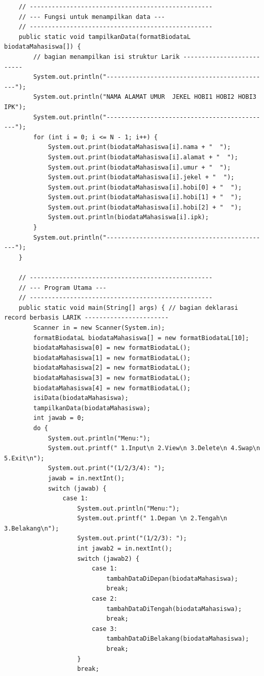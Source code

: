 \documentclass[a4paper,12pt]{article}
\begin{document}
\begin{lstlisting}
    // --------------------------------------------------
    // --- Fungsi untuk menampilkan data ---
    // --------------------------------------------------
    public static void tampilkanData(formatBiodataL biodataMahasiswa[]) {
        // bagian menampilkan isi struktur Larik --------------------------
        System.out.println("---------------------------------------------");
        System.out.println("NAMA ALAMAT UMUR  JEKEL HOBI1 HOBI2 HOBI3 IPK");
        System.out.println("---------------------------------------------");
        for (int i = 0; i <= N - 1; i++) {
            System.out.print(biodataMahasiswa[i].nama + "  ");
            System.out.print(biodataMahasiswa[i].alamat + "  ");
            System.out.print(biodataMahasiswa[i].umur + "  ");
            System.out.print(biodataMahasiswa[i].jekel + "  ");
            System.out.print(biodataMahasiswa[i].hobi[0] + "  ");
            System.out.print(biodataMahasiswa[i].hobi[1] + "  ");
            System.out.print(biodataMahasiswa[i].hobi[2] + "  ");
            System.out.println(biodataMahasiswa[i].ipk);
        }
        System.out.println("---------------------------------------------");
    }

    // --------------------------------------------------
    // --- Program Utama ---
    // --------------------------------------------------
    public static void main(String[] args) { // bagian deklarasi record berbasis LARIK -----------------------
        Scanner in = new Scanner(System.in);
        formatBiodataL biodataMahasiswa[] = new formatBiodataL[10];
        biodataMahasiswa[0] = new formatBiodataL();
        biodataMahasiswa[1] = new formatBiodataL();
        biodataMahasiswa[2] = new formatBiodataL();
        biodataMahasiswa[3] = new formatBiodataL();
        biodataMahasiswa[4] = new formatBiodataL();
        isiData(biodataMahasiswa);
        tampilkanData(biodataMahasiswa);
        int jawab = 0;
        do {
            System.out.println("Menu:");
            System.out.printf(" 1.Input\n 2.View\n 3.Delete\n 4.Swap\n 5.Exit\n");
            System.out.print("(1/2/3/4): ");
            jawab = in.nextInt();
            switch (jawab) {
                case 1:
                    System.out.println("Menu:");
                    System.out.printf(" 1.Depan \n 2.Tengah\n 3.Belakang\n");
                    System.out.print("(1/2/3): ");
                    int jawab2 = in.nextInt();
                    switch (jawab2) {
                        case 1:
                            tambahDataDiDepan(biodataMahasiswa);
                            break;
                        case 2:
                            tambahDataDiTengah(biodataMahasiswa);
                            break;
                        case 3:
                            tambahDataDiBelakang(biodataMahasiswa);
                            break;
                    }
                    break;


\end{lstlisting}
\end{document}
